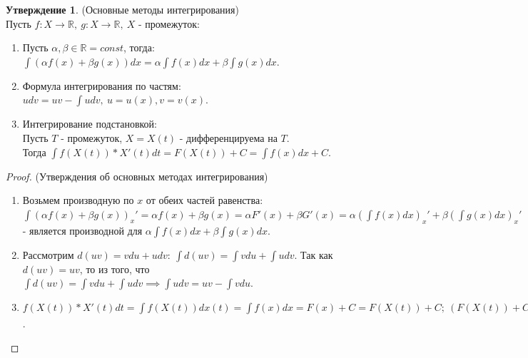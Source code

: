 \documentclass{report}
\theoremstyle{definition}
\newtheorem{statement}{Утверждение}[section]
\begin{document}
\begin{statement}
  (Основные методы интегрирования) \\
  Пусть \(f: X \rightarrow \mathbb{R}, \ g:X \rightarrow \mathbb{R}, \ X\) - промежуток:
  \begin{enumerate}
    \item Пусть \(\alpha, \beta \in \mathbb{R} = const\), тогда:\\
          \(\int (\alpha f(x) + \beta g(x)) dx = \alpha \int f(x) dx + \beta \int g(x) dx\).
    \item Формула интегрирования по частям: \\
          \(udv = uv - \int udv, \ u = u(x), v = v(x)\).
    \item Интегрирование подстановкой: \\
          Пусть \(T\) - промежуток, \(X = X(t)\) - дифференцируема на \(T\). \\
          Тогда \(\int f(X(t)) * X'(t) dt = F(X(t)) + C = \int f(x) dx + C\).
  \end{enumerate}
\end{statement}

\begin{proof}
  (Утверждения об основных методах интегрирования)
  \begin{enumerate}
    \item Возьмем производную по \(x\) от обеих частей равенства: \(\int(\alpha f(x) +
          \beta g(x))_{x}' = \alpha f(x) + \beta g(x) = \alpha F'(x) + \beta G'(x) =
          \alpha(\int f(x) dx)_{x}' + \beta(\int g(x) dx)_{x}'\) - является производной для
          \(\alpha \int f(x) dx + \beta \int g(x) dx\).
    \item Рассмотрим \(d(uv) = v du + u dv: \ \int d(uv) = \int v du + \int u dv\).
          Так как \(d(uv) = uv\), то из того, что \(\int d(uv) = \int v du + \int u dv
          \implies \int u dv = uv - \int v du\).
    \item \(f(X(t)) * X'(t) dt = \int f(X(t)) dx(t) = \int f(x) dx = F(x) + C =
          F(X(t)) + C; \ (F(X(t)) + C)_{t}' = F_{t}' * X_{t}' = f(x) * X'(t) =
          (\int f(X(t)) * X'(t) dt)_{t}'\).
  \end{enumerate}
\end{proof}
\end{document}
